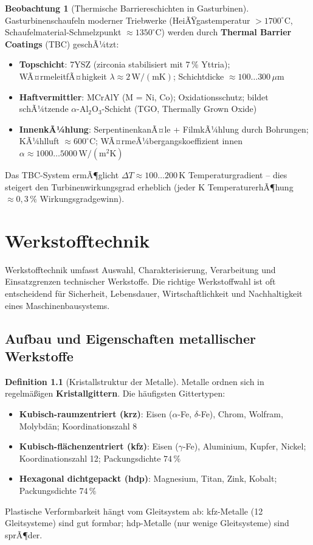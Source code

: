 ﻿\documentclass[a4paper,12pt]{report}
\theoremstyle{definition}
\newtheorem{definition}{Definition}
\newtheorem{beobachtung}{Beobachtung}
\begin{document}
\begin{beobachtung}[Thermische Barriereschichten in Gasturbinen]
Gasturbinenschaufeln moderner Triebwerke (HeiÃŸgastemperatur $> 1700^\circ\mathrm{C}$,
Schaufelmaterial-Schmelzpunkt $\approx 1350^\circ\mathrm{C}$) werden durch
\textbf{Thermal Barrier Coatings} (TBC) geschÃ¼tzt:
\begin{itemize}
    \item[-] \textbf{Topschicht}: 7YSZ (zirconia stabilisiert mit 7\,\% Yttria);
          WÃ¤rmeleitfÃ¤higkeit $\lambda \approx 2\,\mathrm{W/(mK)}$; Schichtdicke $\approx 100\ldots300\,\mu\mathrm{m}$
    \item[-] \textbf{Haftvermittler}: MCrAlY (M = Ni, Co); Oxidationsschutz;
          bildet schÃ¼tzende $\alpha$-Al$_2$O$_3$-Schicht (TGO, Thermally Grown Oxide)
    \item[-] \textbf{InnenkÃ¼hlung}: SerpentinenkanÃ¤le + FilmkÃ¼hlung durch
          Bohrungen; KÃ¼hlluft $\approx 600^\circ\mathrm{C}$;
          WÃ¤rmeÃ¼bergangskoeffizient innen $\alpha \approx 1000\ldots5000\,\mathrm{W/(m^2 K)}$
\end{itemize}
Das TBC-System ermÃ¶glicht $\Delta T \approx 100\ldots200\,\mathrm{K}$ Temperaturgradient --
dies steigert den Turbinenwirkungsgrad erheblich (jeder K TemperaturerhÃ¶hung
$\approx 0{,}3\,\%$ Wirkungsgradgewinn).
\end{beobachtung}

\chapter{Werkstofftechnik}

Werkstofftechnik umfasst Auswahl, Charakterisierung, Verarbeitung
und Einsatzgrenzen technischer Werkstoffe. Die richtige Werkstoffwahl
ist oft entscheidend f\"ur Sicherheit, Lebensdauer, Wirtschaftlichkeit
und Nachhaltigkeit eines Maschinenbausystems.

\section{Aufbau und Eigenschaften metallischer Werkstoffe}

\begin{definition}[Kristallstruktur der Metalle]
Metalle ordnen sich in regelm\"a\ss{}igen \textbf{Kristallgittern}.
Die h\"aufigsten Gittertypen:
\begin{itemize}
    \item[-] \textbf{Kubisch-raumzentriert (krz)}: Eisen ($\alpha$-Fe, $\delta$-Fe),
          Chrom, Wolfram, Molybd\"an; Koordinationszahl 8
    \item[-] \textbf{Kubisch-fl\"achenzentriert (kfz)}: Eisen ($\gamma$-Fe), Aluminium,
          Kupfer, Nickel; Koordinationszahl 12; Packungsdichte $74\,\%$
    \item[-] \textbf{Hexagonal dichtgepackt (hdp)}: Magnesium, Titan, Zink,
          Kobalt; Packungsdichte $74\,\%$
\end{itemize}
Plastische Verformbarkeit h\"angt vom Gleitsystem ab: kfz-Metalle
(12 Gleitsysteme) sind gut formbar; hdp-Metalle (nur wenige Gleitsysteme)
sind sprÃ¶der.
\end{definition}
\end{document}
